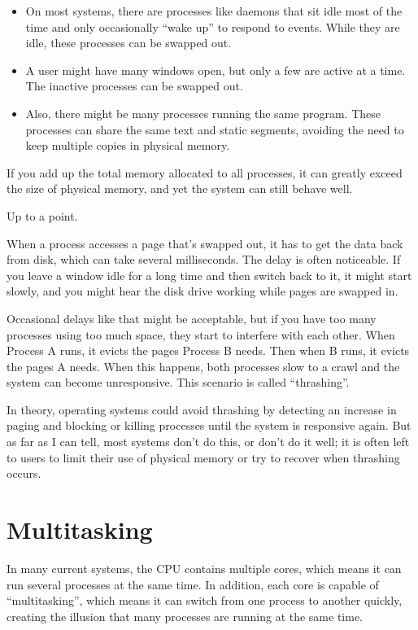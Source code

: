 \documentclass[12pt]{book}
\begin{document}
{\begin{itemize}
\item On most systems, there are processes like daemons that sit idle
  most of the time and only occasionally ``wake up'' to respond to
  events.  While they are idle, these processes can be swapped out.

\item A user might have many windows open, but only a few are active
  at a time.  The inactive processes can be swapped out.

\item Also, there might be many processes running the same program.
  These processes can share the same text and static segments, avoiding the need to keep multiple copies in physical memory.

\end{itemize}

If you add up the total memory allocated to all processes, it can
greatly exceed the size of physical memory, and yet the system can
still behave well.

Up to a point.

When a process accesses a page that's swapped out, it has to get the
data back from disk, which can take several milliseconds.  The
delay is often noticeable.  If you leave a window idle for a long
time and then switch back to it, it might start slowly,
and you might hear the disk drive working while pages are
swapped in.  

Occasional delays like that might be acceptable, but if you have too
many processes using too much space, they start to interfere with each
other.  When Process A runs, it evicts the pages Process B needs.
Then when B runs, it evicts the pages A needs.  When this happens,
both processes slow to a crawl and the system can become unresponsive.
This scenario is called ``thrashing''.

In theory, operating systems could avoid thrashing by detecting an
increase in paging and blocking or killing processes until the system
is responsive again.  But as far as I can tell, most systems don't do
this, or don't do it well; it is often left to users to limit their
use of physical memory or try to recover when thrashing occurs.


\chapter{Multitasking}

In many current systems, the CPU contains multiple cores, which means
it can run several processes at the same time.  In addition, each core
is capable of ``multitasking'', which means it can switch from one
process to another quickly, creating the illusion that many processes
are running at the same time.

}
\end{document}
